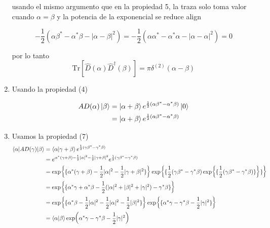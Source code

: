 \begin{enumerate}
        usando el mismo argumento que en la propiedad 5, la traza solo toma valor cuando $\alpha = \beta$ y la potencia de la exponencial se reduce align

        \begin{equation*}
          -\frac{1}{2}(\alpha\beta^* - \alpha^* \beta -|\alpha - \beta|^2) = -\frac{1}{2}(\alpha\alpha^* - \alpha^*\alpha -|\alpha - \alpha|^2) = 0
        \end{equation*}

        por lo tanto
        \begin{equation*}
          \mathrm{Tr}[\hat{D}(\alpha)\hat{D}^\dagger(\beta)] = \pi \delta^{(2)}(\alpha-\beta)
        \end{equation*}
  \item Usando la propiedad (4)

        \begin{align*}
          A{D}(\alpha)\ket{\beta} & = \ket{\alpha + \beta} e^{\frac{1}{2}(\alpha\beta^* - \alpha^*\beta)}\ket{0} \\
                                     & = \ket{\alpha + \beta} e^{\frac{1}{2}(\alpha\beta^* - \alpha^*\beta)}
        \end{align*}
  \item Usamos la propiedad (7)
        \begin{align*}
          \langle \alpha \vert A{D}(\gamma)\vert \beta\rangle & = \braket{\alpha}{\gamma + \beta} e^{\frac{1}{2}(\gamma\beta^{*}-\gamma^{*}\beta)}                                                                                                                       \\
                                                                 & = e^{\alpha^*(\gamma + \beta) - \frac{1}{2}|\alpha|^2 - \frac{1}{2}|\gamma + \beta|^2}e^{\frac{1}{2}(\gamma\beta^* - \gamma^*\beta)}                                                                     \\
                                                                 & = \exp{\{ \alpha^*(\gamma + \beta) - \frac{1}{2}|\alpha|^2 -\frac{1}{2}|\gamma + \beta|^2 \}} \exp{\{ \frac{1}{2}(\gamma\beta^* - \gamma^*\beta)\exp{\{\frac{1}{2}(\gamma\beta^* - \gamma^*\beta)\}} \}} \\
                                                                 & = \exp{\{ \alpha^*\gamma + \alpha^*\beta - \frac{1}{2}(|\alpha|^2 + |\beta|^2 + |\gamma|^2) - \gamma^*\beta \}}                                                                                          \\
                                                                 & = \exp{\{ \alpha^*\beta - \frac{1}{2}|\alpha|^2 - \frac{1}{2}|\alpha|^2 - \frac{1}{2}|\beta|^2 \}} \exp{\{ \alpha^* \gamma - \gamma^*\beta -\frac{1}{2}|\gamma|^2 \}}                                    \\
                                                                 & = \braket{\alpha}{\beta}\exp(\alpha^*\gamma - \gamma^*\beta - \frac{1}{2}|\gamma|^2)
        \end{align*}


\end{enumerate}
